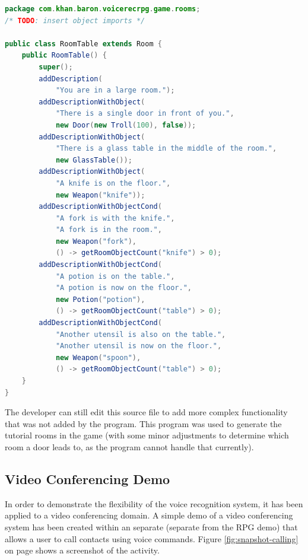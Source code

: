 \documentclass[11pt]{article}
\begin{document}
\begin{lstlisting}[language=Java, label=lst:room-table-java]
package com.khan.baron.voicerecrpg.game.rooms;
/* TODO: insert object imports */

public class RoomTable extends Room {
    public RoomTable() {
        super();
        addDescription(
            "You are in a large room.");
        addDescriptionWithObject(
            "There is a single door in front of you.",
            new Door(new Troll(100), false));
        addDescriptionWithObject(
            "There is a glass table in the middle of the room.",
            new GlassTable());
        addDescriptionWithObject(
            "A knife is on the floor.",
            new Weapon("knife"));
        addDescriptionWithObjectCond(
            "A fork is with the knife.",
            "A fork is in the room.",
            new Weapon("fork"),
            () -> getRoomObjectCount("knife") > 0);
        addDescriptionWithObjectCond(
            "A potion is on the table.",
            "A potion is now on the floor.",
            new Potion("potion"),
            () -> getRoomObjectCount("table") > 0);
        addDescriptionWithObjectCond(
            "Another utensil is also on the table.",
            "Another utensil is now on the floor.",
            new Weapon("spoon"),
            () -> getRoomObjectCount("table") > 0);
    }
}
\end{lstlisting}

The developer can still edit this source file to add more complex functionality that was not added by the program. This program was used to generate the tutorial rooms in the game (with some minor adjustments to determine which room a door leads to, as the program cannot handle that currently).

\subsection{Video Conferencing Demo}
\label{section:calling-demo}

In order to demonstrate the flexibility of the voice recognition system, it has been applied to a video conferencing domain. A simple demo of a video conferencing system has been created within an separate (separate from the RPG demo) that allows a user to call contacts using voice commands. Figure \ref{fig:snapshot-calling} on page \pageref{fig:snapshot-calling} shows a screenshot of the activity.
\end{document}
